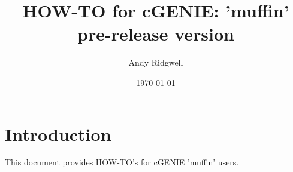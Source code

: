 \documentclass[10pt,twoside]{article}
\title{HOW-TO for cGENIE: 'muffin' pre-release version}
\author{Andy Ridgwell}
\date{\today}
\begin{document}

\maketitle


\tableofcontents



\newpage
\section{Introduction}\label{Introduction}

This document provides HOW-TO's for cGENIE 'muffin' users.

\end{document}
